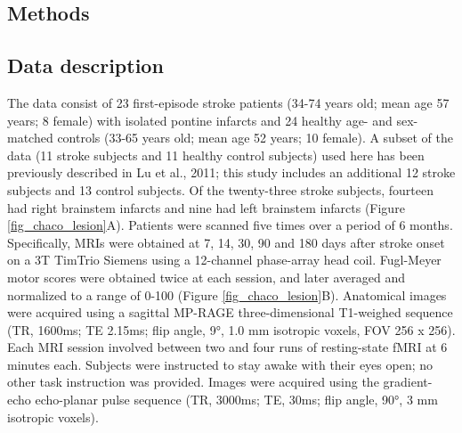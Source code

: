 \documentclass[phd,tocprelim]{cornell}
\begin{document}
\subsection*{Methods}

	\subsection{Data description}
	 The data consist of 23 first-episode stroke patients (34-74 years old; mean age 57 years; 8 female) with isolated pontine infarcts and 24 healthy age- and sex-matched controls (33-65 years old; mean age 52 years; 10 female). A subset of the data (11 stroke subjects and 11 healthy control subjects) used here has been previously described in Lu et al., 2011; this study includes an additional 12 stroke subjects and 13 control subjects. Of the twenty-three stroke subjects, fourteen  had right brainstem infarcts and nine had left brainstem infarcts (Figure \ref{fig_chaco_lesion}A). Patients were scanned five times over a period of 6 months. Specifically, MRIs were obtained at 7, 14, 30, 90 and 180 days after stroke onset on a 3T TimTrio Siemens using a 12-channel phase-array head coil. Fugl-Meyer motor scores were obtained twice at each session, and later averaged and normalized to a range of 0-100 (Figure \ref{fig_chaco_lesion}B). Anatomical images were acquired using a sagittal MP-RAGE three-dimensional T1-weighed sequence (TR, 1600ms; TE 2.15ms; flip angle, 9°, 1.0 mm isotropic voxels, FOV 256 x 256). Each MRI session involved between two and four runs of resting-state fMRI at 6 minutes each. Subjects were instructed to stay awake with their eyes open; no other task instruction was provided. Images were acquired using the gradient-echo echo-planar pulse sequence (TR, 3000ms; TE, 30ms; flip angle, 90°, 3 mm isotropic voxels).
\end{document}
